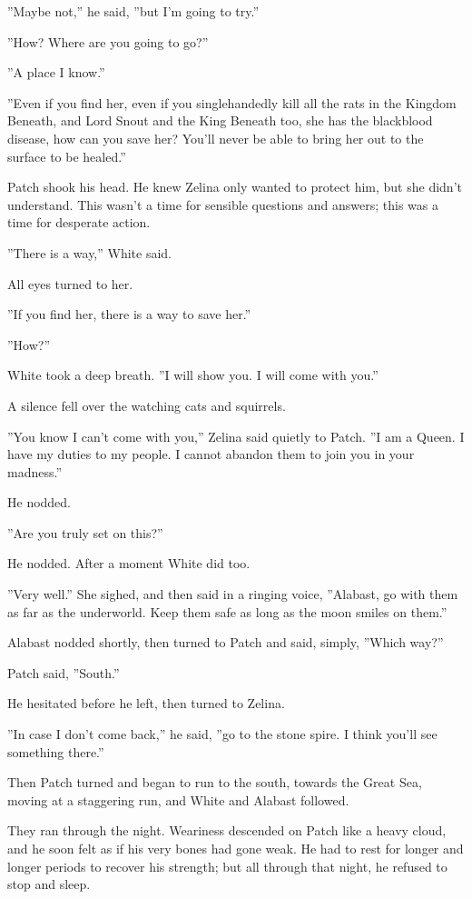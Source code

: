 \documentclass[12pt]{book}
\begin{document}
''Maybe not,'' he said, ''but I'm going to try.''

''How? Where are you going to go?''

''A place I know.''

''Even if you find her, even if you singlehandedly kill all the rats in the Kingdom Beneath, and Lord Snout and the King Beneath too, she has the blackblood disease, how can you save her? You'll never be able to bring her out to the surface to be healed.''

Patch shook his head. He knew Zelina only wanted to protect him, but she didn't understand. This wasn't a time for sensible questions and answers; this was a time for desperate action.

''There is a way,'' White said.

All eyes turned to her.

''If you find her, there is a way to save her.''

''How?''

White took a deep breath. ''I will show you. I will come with you.''

A silence fell over the watching cats and squirrels.

''You know I can't come with you,'' Zelina said quietly to Patch. ''I am a Queen. I have my duties to my people. I cannot abandon them to join you in your madness.''

He nodded.

''Are you truly set on this?''

He nodded. After a moment White did too.

''Very well.'' She sighed, and then said in a ringing voice, ''Alabast, go with them as far as the underworld. Keep them safe as long as the moon smiles on them.''

Alabast nodded shortly, then turned to Patch and said, simply, ''Which way?''

Patch said, ''South.''

He hesitated before he left, then turned to Zelina.

''In case I don't come back,'' he said, ''go to the stone spire. I think you'll see something there.''

Then Patch turned and began to run to the south, towards the Great Sea, moving at a staggering run, and White and Alabast followed.

They ran through the night. Weariness descended on Patch like a heavy cloud, and he soon felt as if his very bones had gone weak. He had to rest for longer and longer periods to recover his strength; but all through that night, he refused to stop and sleep.
\end{document}
